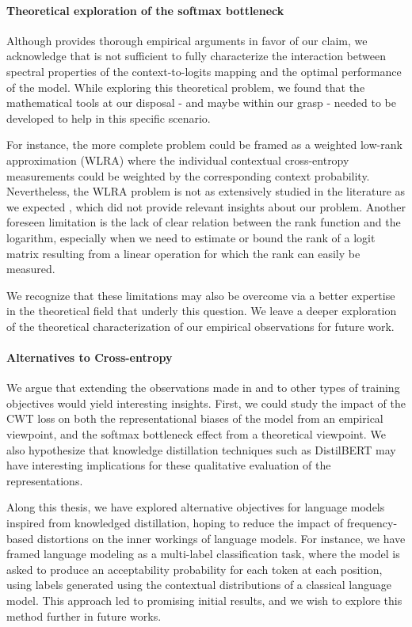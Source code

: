 \paragraph{Theoretical exploration of the softmax bottleneck} Although  provides thorough empirical arguments in favor of our claim, we acknowledge that  is not sufficient to fully characterize the interaction between spectral properties of the context-to-logits mapping and the optimal performance of the model. While exploring this theoretical problem, we found that the mathematical tools at our disposal - and maybe within our grasp - needed to be developed to help in this specific scenario.

For instance, the more complete problem could be framed as a weighted low-rank approximation (WLRA) where the individual contextual cross-entropy measurements could be weighted by the corresponding context probability. Nevertheless, the WLRA problem is not as extensively studied in the literature as we expected \citep{10.1145/2897518.2897639}, which did not provide relevant insights about our problem. Another foreseen limitation is the lack of clear relation between the rank function and the logarithm, especially when we need to estimate or bound the rank of a logit matrix resulting from a linear operation for which the rank can easily be measured.

We recognize that these limitations may also be overcome via a better expertise in the theoretical field that underly this question. We leave a deeper exploration of the theoretical characterization of our empirical observations for future work.

\paragraph{Alternatives to Cross-entropy} We argue that extending the observations made in  and  to other types of training objectives would yield interesting insights. First, we could study the impact of the CWT loss on both the representational biases of the model from an empirical viewpoint, and the softmax bottleneck effect from a theoretical viewpoint. We also hypothesize that knowledge distillation techniques such as DistilBERT \citep{sanh2019distilbert} may have interesting implications for these qualitative evaluation of the representations.

Along this thesis, we have explored alternative objectives for language models inspired from knowledged distillation, hoping to reduce the impact of frequency-based distortions on the inner workings of language models. For instance, we have framed language modeling as a multi-label classification task, where the model is asked to produce an acceptability probability for each token at each position, using labels generated using the contextual distributions of a classical language model. This approach led to promising initial results, and we wish to explore this method further in future works.

